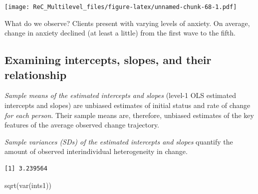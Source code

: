 \documentclass[
  11pt,
]{book}
\newenvironment{Shaded}{\begin{snugshade}}{\end{snugshade}}
\newcommand{\AttributeTok}[1]{\textcolor[rgb]{0.77,0.63,0.00}{#1}}
\newcommand{\CommentTok}[1]{\textcolor[rgb]{0.56,0.35,0.01}{\textit{#1}}}
\newcommand{\ConstantTok}[1]{\textcolor[rgb]{0.00,0.00,0.00}{#1}}
\newcommand{\ControlFlowTok}[1]{\textcolor[rgb]{0.13,0.29,0.53}{\textbf{#1}}}
\newcommand{\DecValTok}[1]{\textcolor[rgb]{0.00,0.00,0.81}{#1}}
\newcommand{\FunctionTok}[1]{\textcolor[rgb]{0.00,0.00,0.00}{#1}}
\newcommand{\NormalTok}[1]{#1}
\newcommand{\OtherTok}[1]{\textcolor[rgb]{0.56,0.35,0.01}{#1}}
\newcommand{\SpecialCharTok}[1]{\textcolor[rgb]{0.00,0.00,0.00}{#1}}
\begin{document}
\texttt{[image: ReC\_Multilevel\_files/figure-latex/unnamed-chunk-68-1.pdf]}

What do we observe? Clients present with varying levels of anxiety. On average, change in anxiety declined (at least a little) from the first wave to the fifth.

\hypertarget{examining-intercepts-slopes-and-their-relationship}{%
\subsection{Examining intercepts, slopes, and their relationship}\label{examining-intercepts-slopes-and-their-relationship}}

\emph{Sample means of the estimated intercepts and slopes} (level-1 OLS estimated intercepts and slopes) are unbiased estimates of initial status and rate of change \emph{for each person}. Their sample means are, therefore, unbiased estimates of the key features of the average observed change trajectory.

\emph{Sample variances (SDs) of the estimated intercepts and slopes} quantify the amount of observed interindividual heterogeneity in change.

\begin{Shaded}
\end{Shaded}

\begin{verbatim}
[1] 3.239564
\end{verbatim}

\begin{Shaded}
\begin{Highlighting}[]
\FunctionTok{sqrt}\NormalTok{(}\FunctionTok{var}\NormalTok{(ints1))}
\end{Highlighting}
\end{Shaded}
\end{document}
